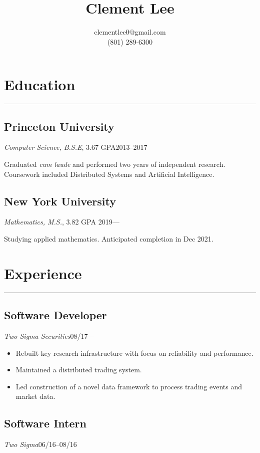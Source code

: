 \documentclass[11pt]{article}
\title{\vspace{-2\baselineskip}Clement Lee\vspace{-\baselineskip}}
\author{clementlee0@gmail.com\\(801) 289-6300}
\date{}
\begin{document}
\maketitle

\vspace{-2\baselineskip}


\section*{Education}
\hrule
  \subsection*{Princeton University}
  \emph{Computer Science, B.S.E}, 3.67 GPA\hfill 2013--2017

  Graduated \emph{cum laude} and performed two years of independent research.
  Coursework included Distributed Systems and Artificial Intelligence.
  
  \subsection*{New York University}
  \emph{Mathematics, M.S.}, 3.82 GPA \hfill2019---
  
  Studying applied mathematics.
  Anticipated completion in Dec 2021.

\section*{Experience}
\hrule

  \subsection*{Software Developer}
  \emph{Two Sigma Securities}\hfill08/17---

  \begin{itemize}
    \item Rebuilt key research infrastructure with focus on reliability and performance.
    \item Maintained a distributed trading system.
    \item Led construction of a novel data framework to process trading events and market data.
  \end{itemize}

  \subsection*{Software Intern}
  \emph{Two Sigma}\hfill 06/16--08/16
\end{document}
